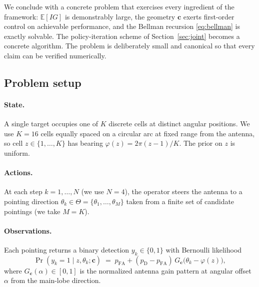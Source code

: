 \documentclass[11pt,a4paper]{article}
\newcommand{\E}{\mathbb{E}}
\begin{document}
We conclude with a concrete problem that exercises every ingredient of the framework: $\E[IG]$ is demonstrably large, the geometry $\bm{c}$ exerts first-order control on achievable performance, and the Bellman recursion \eqref{eq:bellman} is exactly solvable.  The policy-iteration scheme of Section~\ref{sec:joint} becomes a concrete algorithm.  The problem is deliberately small and canonical so that every claim can be verified numerically.

\subsection{Problem setup}
\label{subsec:radar_setup}

\paragraph{State.}  A single target occupies one of $K$ discrete cells at distinct angular positions.  We use $K = 16$ cells equally spaced on a circular arc at fixed range from the antenna, so cell $z \in \{1, \ldots, K\}$ has bearing $\varphi(z) = 2\pi(z-1)/K$.  The prior on $z$ is uniform.

\paragraph{Actions.}  At each step $k = 1, \ldots, N$ (we use $N = 4$), the operator steers the antenna to a pointing direction $\theta_k \in \Theta = \{\theta_1, \ldots, \theta_M\}$ taken from a finite set of candidate pointings (we take $M = K$).

\paragraph{Observations.}  Each pointing returns a binary detection $y_k \in \{0, 1\}$ with Bernoulli likelihood
\begin{equation}
  \Pr(y_k = 1 \mid z, \theta_k; \bm{c}) \;=\; p_{\mathrm{FA}} + (p_{\mathrm{D}} - p_{\mathrm{FA}})\, G_{\bm{c}}\!\bigl(\theta_k - \varphi(z)\bigr),
  \label{eq:radar_likelihood}
\end{equation}
where $G_{\bm{c}}(\alpha) \in [0, 1]$ is the normalized antenna gain pattern at angular offset $\alpha$ from the main-lobe direction.
\end{document}
